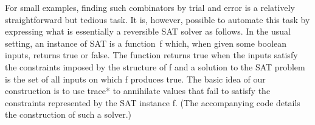 \documentclass{llncs}
\begin{document}

For small examples, finding such combinators by trial and error is a
relatively straightforward but tedious task. It is, however, possible to
automate this task by expressing what is essentially a reversible SAT solver
as follows. In the usual setting, an instance of SAT is a function~{{f}}
which, when given some boolean inputs, returns {{true}} or {{false}}. The
function returns {{true}} when the inputs satisfy the constraints imposed by
the structure of {{f}} and a solution to the SAT problem is the set of all
inputs on which {{f}} produces {{true}}. The basic idea of our construction
is to use {{trace*}} to annihilate values that fail to satisfy the
constraints represented by the SAT instance {{f}}. (The accompanying code
details the construction of such a solver.) 







\end{document}
